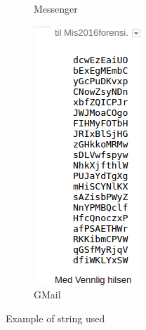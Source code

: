 \begin{figure}[h]
\begin{subfigure}[b]{0.15\textwidth}
\caption{Messenger}
\end{subfigure}
 \begin{subfigure}[b]{0.2\textwidth}
\includegraphics[width=\textwidth]{figures/random_string_in_gmail}
\caption{GMail}
\end{subfigure}
\caption{Example of string used}
\end{figure}

